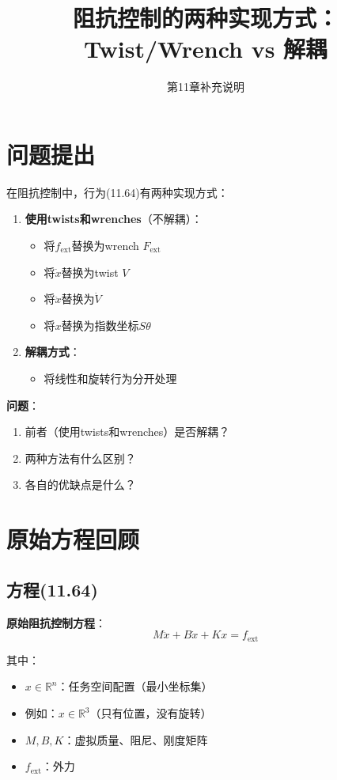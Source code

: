 \documentclass[12pt,a4paper]{article}
\title{阻抗控制的两种实现方式：Twist/Wrench vs 解耦}
\author{第11章补充说明}
\date{}
\begin{document}
\maketitle

\section{问题提出}

在阻抗控制中，行为(11.64)有两种实现方式：

\begin{enumerate}
\item \textbf{使用twists和wrenches}（不解耦）：
\begin{itemize}
\item 将$f_{\text{ext}}$替换为wrench $F_{\text{ext}}$
\item 将$\dot{x}$替换为twist $V$
\item 将$\ddot{x}$替换为$\dot{V}$
\item 将$x$替换为指数坐标$S\theta$
\end{itemize}

\item \textbf{解耦方式}：
\begin{itemize}
\item 将线性和旋转行为分开处理
\end{itemize}
\end{enumerate}

\textbf{问题}：
\begin{enumerate}
\item 前者（使用twists和wrenches）是否解耦？
\item 两种方法有什么区别？
\item 各自的优缺点是什么？
\end{enumerate}

\section{原始方程回顾}

\subsection{方程(11.64)}

\textbf{原始阻抗控制方程}：
\begin{equation}
M\ddot{x} + B\dot{x} + Kx = f_{\text{ext}} \tag{11.64}
\end{equation}

其中：
\begin{itemize}
\item $x \in \mathbb{R}^n$：任务空间配置（最小坐标集）
\item 例如：$x \in \mathbb{R}^3$（只有位置，没有旋转）
\item $M, B, K$：虚拟质量、阻尼、刚度矩阵
\item $f_{\text{ext}}$：外力
\end{itemize}
\end{document}
